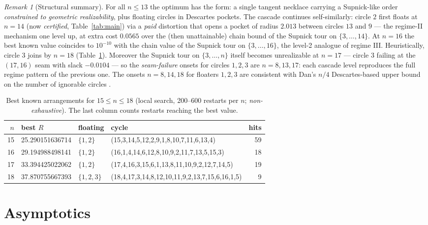 \documentclass[11pt]{article}
\theoremstyle{definition}
\theoremstyle{remark}
\newtheorem{remark}[theorem]{Remark}
\begin{document}
\begin{remark}[Structural summary]
For all $n\le13$ the optimum has the form: a single tangent necklace carrying a Supnick-like order \emph{constrained to geometric realizability}, plus floating circles in Descartes pockets. The cascade continues self-similarly: circle $2$ first floats at $n=14$ (now \emph{certified}, Table~\ref{tab:main}) via a \emph{paid} distortion that opens a pocket of radius $2.013$ between circles $13$ and $9$ --- the regime-II mechanism one level up, at extra cost $0.0565$ over the (then unattainable) chain bound of the Supnick tour on $\{3,\dots,14\}$. At $n=16$ the best known value coincides to $10^{-10}$ with the chain value of the Supnick tour on $\{3,\dots,16\}$, the level-2 analogue of regime III. Heuristically, circle $3$ joins by $n=18$ (Table~\ref{tab:heur}). Moreover the Supnick tour on $\{3,\dots,n\}$ itself becomes unrealizable at $n=17$ --- circle $3$ failing at the $(17,16)$ seam with slack $-0.0104$ --- so the \emph{seam-failure} onsets for circles $1,2,3$ are $n=8,13,17$: each cascade level reproduces the full regime pattern of the previous one. The onsets $n=8,14,18$ for floaters $1,2,3$ are consistent with Dan's $n/4$ Descartes-based upper bound on the number of ignorable circles \cite{mse}.
\end{remark}

\begin{table}[ht]\centering
\caption{Best known arrangements for $15\le n\le18$ (local search, 200--600 restarts per $n$; \emph{non-exhaustive}). The last column counts restarts reaching the best value.}
\label{tab:heur}
\small
\begin{tabular}{rlllr}
\toprule
$n$ & best $R$ & floating & cycle & hits \\
\midrule
15 & 25.290151636714 & $\{1,2\}$ & (15,3,14,5,12,2,9,1,8,10,7,11,6,13,4) & 59 \\
16 & 29.194988498141 & $\{1,2\}$ & (16,1,4,14,6,12,8,10,9,2,11,7,13,5,15,3) & 18 \\
17 & 33.394425022062 & $\{1,2\}$ & (17,4,16,3,15,6,1,13,8,11,10,9,2,12,7,14,5) & 19 \\
18 & 37.870755667393 & $\{1,2,3\}$ & (18,4,17,3,14,8,12,10,11,9,2,13,7,15,6,16,1,5) & 9 \\
\bottomrule
\end{tabular}
\end{table}

\section{Asymptotics}\label{sec:asymptotics}
\end{document}
